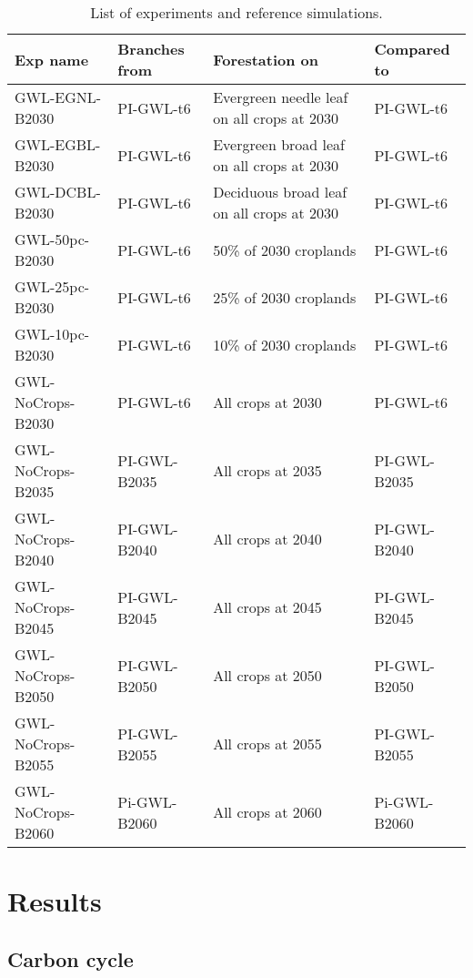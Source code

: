 \documentclass[]{article}
\begin{document}
\begin{table}[]
    \caption{List of experiments and reference simulations.}
    \label{tab:experiments}
    \begin{tabular}{llll}
\hline
Exp name             & Branches from & Forestation on               & Compared to       \\ \hline
GWL-EGNL-B2030       & PI-GWL-t6     & Evergreen needle leaf on all crops at 2030            & PI-GWL-t6         \\
GWL-EGBL-B2030       & PI-GWL-t6     & Evergreen broad leaf on all crops at 2030            & PI-GWL-t6         \\
GWL-DCBL-B2030       & PI-GWL-t6     & Deciduous broad leaf on all crops at 2030            & PI-GWL-t6         \\
GWL-50pc-B2030       & PI-GWL-t6     & 50\% of 2030 croplands       & PI-GWL-t6         \\
GWL-25pc-B2030       & PI-GWL-t6     & 25\% of 2030 croplands       & PI-GWL-t6         \\
GWL-10pc-B2030       & PI-GWL-t6     & 10\% of 2030 croplands       & PI-GWL-t6         \\
GWL-NoCrops-B2030    & PI-GWL-t6     & All crops at 2030            & PI-GWL-t6         \\
GWL-NoCrops-B2035    & PI-GWL-B2035  & All crops at 2035            & PI-GWL-B2035      \\
GWL-NoCrops-B2040    & PI-GWL-B2040  & All crops at 2040            & PI-GWL-B2040      \\
GWL-NoCrops-B2045    & PI-GWL-B2045  & All crops at 2045            & PI-GWL-B2045      \\
GWL-NoCrops-B2050    & PI-GWL-B2050  & All crops at 2050            & PI-GWL-B2050      \\
GWL-NoCrops-B2055    & PI-GWL-B2055  & All crops at 2055            & PI-GWL-B2055      \\
GWL-NoCrops-B2060    & Pi-GWL-B2060  & All crops at 2060            & Pi-GWL-B2060      \\
\end{tabular}
\end{table}

\section{Results}

\subsection{Carbon cycle}
\end{document}

